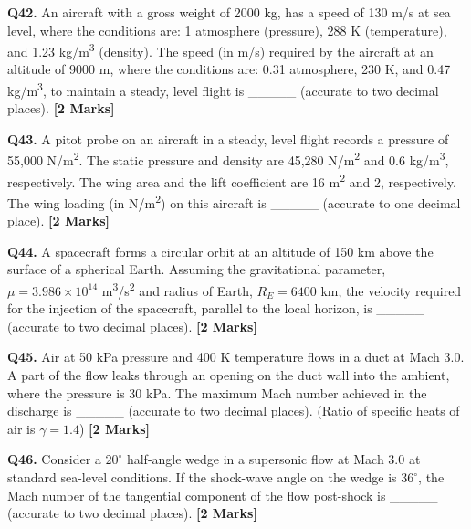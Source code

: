 \documentclass[11pt]{article}
\newcommand{\questionb}[2]{
    \noindent\textbf{Q#2.} #1 \hfill \textbf{[2 Marks]}
}
\begin{document}
\vspace{0.5cm}

\questionb{An aircraft with a gross weight of 2000 kg, has a speed of 130 m/s at sea level, where the conditions are: 1 atmosphere (pressure), 288 K (temperature), and 1.23 kg/m\textsuperscript{3} (density). The speed (in m/s) required by the aircraft at an altitude of 9000 m, where the conditions are: 0.31 atmosphere, 230 K, and 0.47 kg/m\textsuperscript{3}, to maintain a steady, level flight is \_\_\_\_\_ (accurate to two decimal places).}{42}

\vspace{0.5cm}

\questionb{A pitot probe on an aircraft in a steady, level flight records a pressure of 55,000 N/m\textsuperscript{2}. The static pressure and density are 45,280 N/m\textsuperscript{2} and 0.6 kg/m\textsuperscript{3}, respectively. The wing area and the lift coefficient are 16 m\textsuperscript{2} and 2, respectively. The wing loading (in N/m\textsuperscript{2}) on this aircraft is \_\_\_\_\_ (accurate to one decimal place).}{43}

\vspace{0.5cm}

\questionb{A spacecraft forms a circular orbit at an altitude of 150 km above the surface of a spherical Earth. Assuming the gravitational parameter, $\mu = 3.986 \times 10^{14}$ m\textsuperscript{3}/s\textsuperscript{2} and radius of Earth, $R_E = 6400$ km, the velocity required for the injection of the spacecraft, parallel to the local horizon, is \_\_\_\_\_ (accurate to two decimal places).}{44}

\vspace{0.5cm}

\questionb{Air at 50 kPa pressure and 400 K temperature flows in a duct at Mach 3.0. A part of the flow leaks through an opening on the duct wall into the ambient, where the pressure is 30 kPa. The maximum Mach number achieved in the discharge is \_\_\_\_\_ (accurate to two decimal places). (Ratio of specific heats of air is $\gamma = 1.4$)}{45}

\vspace{0.5cm}

\questionb{Consider a $20^\circ$ half-angle wedge in a supersonic flow at Mach 3.0 at standard sea-level conditions. If the shock-wave angle on the wedge is $36^\circ$, the Mach number of the tangential component of the flow post-shock is \_\_\_\_\_ (accurate to two decimal places).}{46}
\end{document}
